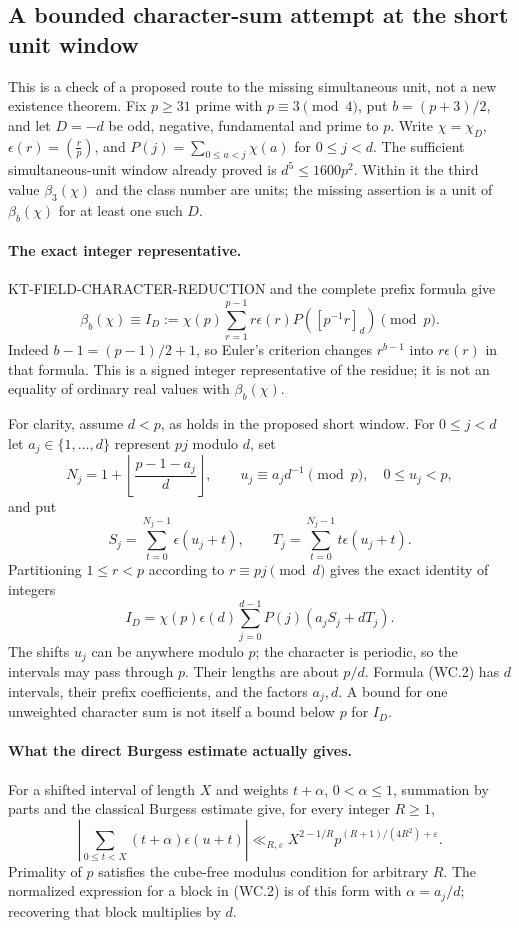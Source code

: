 \subsection{A bounded character-sum attempt at the short unit window}

This is a check of a proposed route to the missing simultaneous
unit, not a new existence theorem.  Fix $p\geq31$ prime with
$p\equiv3\pmod4$, put $b=(p+3)/2$, and let $D=-d$ be odd,
negative, fundamental and prime to $p$.  Write
$\chi=\chi_D$, $\epsilon(r)=(\frac rp)$, and
$P(j)=\sum_{0\leq a<j}\chi(a)$ for $0\leq j<d$.
The sufficient simultaneous-unit window already proved is
$d^5\leq1600p^2$.  Within it the third value $\beta_3(\chi)$
and the class number are units; the missing assertion is a
unit of $\beta_b(\chi)$ for at least one such $D$.

\paragraph{The exact integer representative.}
KT-FIELD-CHARACTER-REDUCTION and the complete prefix formula give
\[
 \beta_b(\chi)\equiv I_D
 :=\chi(p)\sum_{r=1}^{p-1}r\epsilon(r)
                         P([p^{-1}r]_d)\pmod p.
 \tag{WC.1}
\]
Indeed $b-1=(p-1)/2+1$, so Euler's criterion changes
$r^{b-1}$ into $r\epsilon(r)$ in that formula.
This is a signed integer representative of the residue;
it is not an equality of ordinary real values with
$\beta_b(\chi)$.

For clarity, assume $d<p$, as holds in the proposed short
window.  For $0\leq j<d$ let $a_j\in\{1,\ldots,d\}$
represent $pj$ modulo $d$, set
\[
 N_j=1+\left\lfloor\frac{p-1-a_j}{d}\right\rfloor,
 \qquad u_j\equiv a_jd^{-1}\pmod p,
 \quad 0\leq u_j<p,
\]
and put
\[
 S_j=\sum_{t=0}^{N_j-1}\epsilon(u_j+t),\qquad
 T_j=\sum_{t=0}^{N_j-1}t\epsilon(u_j+t).
\]
Partitioning $1\leq r<p$ according to $r\equiv pj\pmod d$
gives the exact identity of integers
\[
 I_D=\chi(p)\epsilon(d)
        \sum_{j=0}^{d-1}P(j)(a_jS_j+dT_j).
 \tag{WC.2}
\]
The shifts $u_j$ can be anywhere modulo $p$; the character
is periodic, so the intervals may pass through $p$.
Their lengths are about $p/d$.  Formula (WC.2) has
$d$ intervals, their prefix coefficients, and the factors
$a_j,d$.  A bound for one unweighted character sum is
not itself a bound below $p$ for $I_D$.

\paragraph{What the direct Burgess estimate actually gives.}
For a shifted interval of length $X$ and weights
$t+\alpha$, $0<\alpha\leq1$, summation by parts and
the classical Burgess estimate give, for every integer
$R\geq1$,
\[
 \left|\sum_{0\leq t<X}(t+\alpha)\epsilon(u+t)\right|
 \ll_{R,\varepsilon}
       X^{2-1/R}p^{(R+1)/(4R^2)+\varepsilon}.
 \tag{WC.3}
\]
Primality of $p$ satisfies the cube-free modulus condition
for arbitrary $R$.  The normalized expression for a block
in (WC.2) is of this form with $\alpha=a_j/d$; recovering
that block multiplies by $d$.

